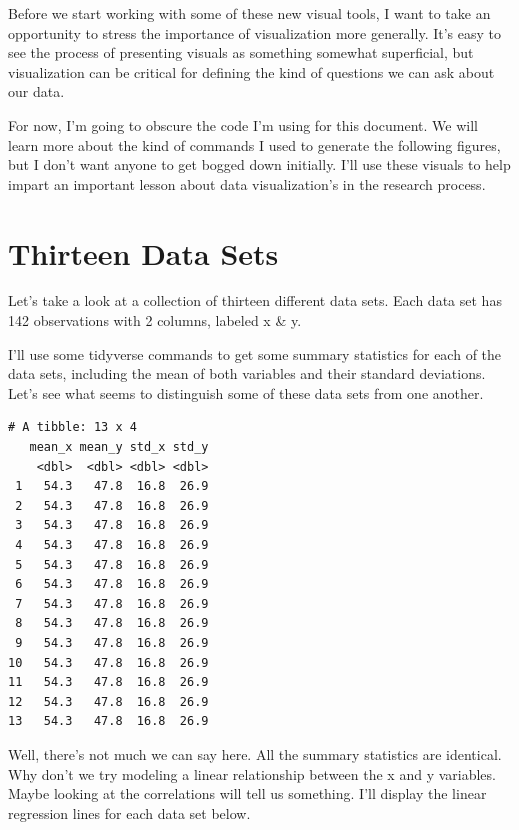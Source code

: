 \documentclass[
  letterpaper,
  DIV=11,
  numbers=noendperiod]{scrreprt}
\begin{document}
Before we start working with some of these new visual tools, I want to
take an opportunity to stress the importance of visualization more
generally. It's easy to see the process of presenting visuals as
something somewhat superficial, but visualization can be critical for
defining the kind of questions we can ask about our data.

For now, I'm going to obscure the code I'm using for this document. We
will learn more about the kind of commands I used to generate the
following figures, but I don't want anyone to get bogged down initially.
I'll use these visuals to help impart an important lesson about data
visualization's in the research process.

\section*{Thirteen Data Sets}\label{thirteen-data-sets}


Let's take a look at a collection of thirteen different data sets. Each
data set has 142 observations with 2 columns, labeled x \& y.

I'll use some tidyverse commands to get some summary statistics for each
of the data sets, including the mean of both variables and their
standard deviations. Let's see what seems to distinguish some of these
data sets from one another.

\begin{verbatim}
# A tibble: 13 x 4
   mean_x mean_y std_x std_y
    <dbl>  <dbl> <dbl> <dbl>
 1   54.3   47.8  16.8  26.9
 2   54.3   47.8  16.8  26.9
 3   54.3   47.8  16.8  26.9
 4   54.3   47.8  16.8  26.9
 5   54.3   47.8  16.8  26.9
 6   54.3   47.8  16.8  26.9
 7   54.3   47.8  16.8  26.9
 8   54.3   47.8  16.8  26.9
 9   54.3   47.8  16.8  26.9
10   54.3   47.8  16.8  26.9
11   54.3   47.8  16.8  26.9
12   54.3   47.8  16.8  26.9
13   54.3   47.8  16.8  26.9
\end{verbatim}

Well, there's not much we can say here. All the summary statistics are
identical. Why don't we try modeling a linear relationship between the x
and y variables. Maybe looking at the correlations will tell us
something. I'll display the linear regression lines for each data set
below.
\end{document}
